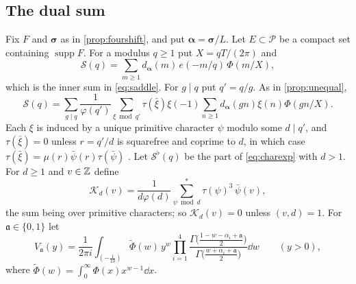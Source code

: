 \documentclass[11pt,colorlinks]{charlie}
\begin{document}
\subsection{The dual sum}
Fix $F$ and $\boldsymbol\sigma$ as in \cref{prop:fourshift}, and put $\boldsymbol\alpha=\boldsymbol\sigma/L$. Let $E\subset\mathcal P$ be a compact set containing $\operatorname{supp}F$. For a modulus $q\ge1$ put $X=qT/(2\pi)$ and
\[
 \mathcal S(q)=\sum_{m\ge1}d_{\boldsymbol\alpha}(m)\,e(-m/q)\,\Phi(m/X),
\]
which is the inner sum in \eqref{eq:saddle}. For $g\mid q$ put $q'=q/g$. As in \cref{prop:unequal},
\begin{equation}\label{eq:charexp}
 \mathcal S(q)=\sum_{g\mid q}\frac1{\varphi(q')}\sum_{\xi\bmod q'}\tau(\bar\xi)\xi(-1)\sum_{n\ge1}d_{\boldsymbol\alpha}(gn)\xi(n)\Phi(gn/X).
\end{equation}
Each $\xi$ is induced by a unique primitive character $\psi$ modulo some $d\mid q'$, and $\tau(\bar\xi)=0$ unless $r=q'/d$ is squarefree and coprime to $d$, in which case $\tau(\bar\xi)=\mu(r)\bar\psi(r)\tau(\bar\psi)$ \cite[Lemma~3.1]{IK}. Let $\mathcal S^\flat(q)$ be the part of \eqref{eq:charexp} with $d>1$. For $d\ge1$ and $v\in\mathbb{Z}$ define
\[
 \mathscr K_d(v)=\frac1{d\varphi(d)}\sum_{\psi\bmod d}^{*}\tau(\psi)^3\,\bar\psi(v),
\]
the sum being over primitive characters; so $\mathscr K_d(v)=0$ unless $(v,d)=1$. For $\mathfrak a\in\{0,1\}$ let
\[
 V_{\mathfrak a}(y)=\frac1{2\pi i}\int_{(-\frac1{10})}\widetilde\Phi(w)\,y^{w}\prod_{i=1}^4\frac{\Gamma\big(\frac{1-w-\alpha_i+\mathfrak a}2\big)}{\Gamma\big(\frac{w+\alpha_i+\mathfrak a}2\big)}\dd w\qquad(y>0),
\]
where $\widetilde\Phi(w)=\int_0^\infty\Phi(x)x^{w-1}\dd x$.
\end{document}
